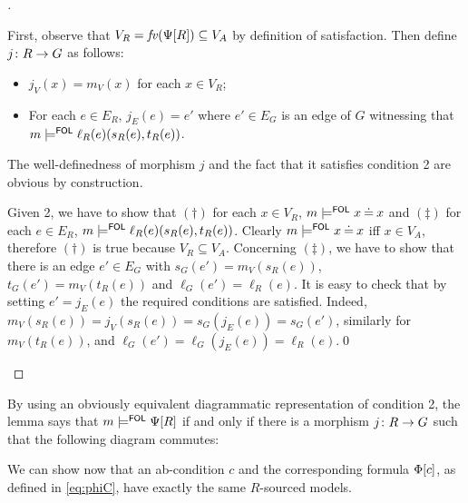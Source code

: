 \begin{proof}[]~
\begin{description}[defsep]
\item[($1 \Rightarrow  2$)] 
First, observe that $V_R = \mathit{fv}(\Psi[{R}]) \subseteq V_A$ by  definition of satisfaction. Then define $j\colon R \rightarrow G$ as follows:
\begin{itemize}
\item $j_V(x) = m_V(x)$ for each $x \in V_R$; 
\item For each $e \in E_R$, $j_E(e) = e'$ where $e' \in E_G$ is an edge of $G$ witnessing that $m \models^{\mathsf{FOL}} \ell_R(e)(s_R(e),t_R(e))$.
\end{itemize}
The well-definedness of morphism $j$ and the fact that it satisfies condition 2 are obvious by construction. 

\item[($2 \Rightarrow  1$)] Given 2, we have to show that $(\dagger)$ for each $x \in V_R$, $m \models^{\mathsf{FOL}} x \mathbin{\doteq} x$ and $(\ddagger)$ for each $e \in E_R$, $m \models^{\mathsf{FOL}} \ell_R(e)(s_R(e),t_R(e))$. Clearly $m \models^{\mathsf{FOL}} x \mathbin{\doteq} x$ iff $x \in V_A$, therefore $(\dagger)$ is true because $V_R \subseteq V_A$. Concerning $(\ddagger)$, we have to show that there is an edge $e' \in E_G$ with $s_G(e') = m_V(s_R(e))$, $t_G(e') = m_V(t_R(e))$ and $\ell_G(e') = \ell_R(e)$. It is easy to check that by setting $e' = j_E(e)$ the required conditions are satisfied. Indeed, $m_V(s_R(e)) = j_V(s_R(e)) = s_G(j_E(e)) = s_G(e')$, similarly for $m_V(t_R(e))$, and $\ell_G(e') = \ell_G(j_E(e)) = \ell_R(e)$.\qed
\end{description}
\end{proof}
%
By using an obviously equivalent diagrammatic representation of condition 2, the lemma says that $m \models^{\mathsf{FOL}} \Psi[{R}]$ if and only if there is a morphism $j \colon R \rightarrow G$ such that the following diagram commutes:
%
\begin{center}
\end{center} 
%
We can show now that an ab-condition $c$ and the corresponding formula $\Phi[{c}]$, as defined in \eqref{eq:phiC}, have exactly the same $R$-sourced models.

